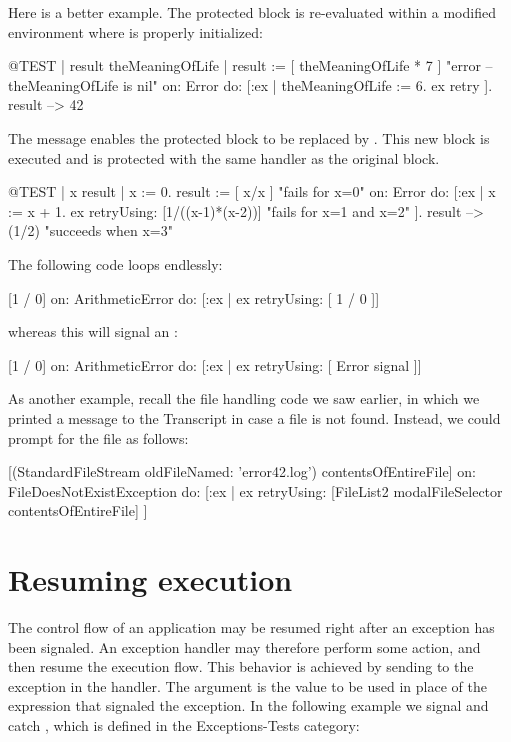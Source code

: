 \documentclass[a4paper,10pt,twoside]{book}
\begin{document}
Here is a better example.
The protected block is re-evaluated within a modified environment where  is properly initialized:
\begin{code}{@TEST | result theMeaningOfLife |}
result := [ theMeaningOfLife * 7 ]    "error -- theMeaningOfLife is nil"
	on: Error
	do: [:ex | theMeaningOfLife := 6. ex retry ].
result --> 42
\end{code}

The message  enables the protected block to be replaced by . This new block is executed and is protected with the same handler as the original block.

\begin{code}{@TEST | x result |}
x := 0.
result := [ x/x ]    "fails for x=0"
	on: Error
	do: [:ex |
		x := x + 1.
		ex retryUsing: [1/((x-1)*(x-2))]    "fails for x=1 and x=2"
	].
result --> (1/2)    "succeeds when x=3"
\end{code}

The following code loops endlessly:
\begin{code}{}
[1 / 0] on: ArithmeticError do: [:ex | ex retryUsing: [ 1 / 0 ]]
\end{code}
whereas this will signal an : 
\begin{code}{}
[1 / 0] on: ArithmeticError do: [:ex | ex retryUsing: [ Error signal ]]
\end{code}

As another example, recall the file handling code we saw earlier, in which we printed a message to the Transcript in case a file is not found. Instead, we could prompt for the file as follows:
\begin{code}{}
[(StandardFileStream oldFileNamed: 'error42.log') contentsOfEntireFile]
	on: FileDoesNotExistException
	do: [:ex | ex retryUsing: [FileList2 modalFileSelector contentsOfEntireFile] ]
\end{code}

\section{Resuming execution}

The control flow of an application may be resumed right after an exception has been signaled. An exception handler may therefore perform some action, and then resume the execution flow. This behavior is achieved by sending  to the exception in the handler.
The argument is the value to be used in place of the expression that signaled the exception.
In the following example we signal and catch , which is defined in the Exceptions-Tests category:
\end{document}

